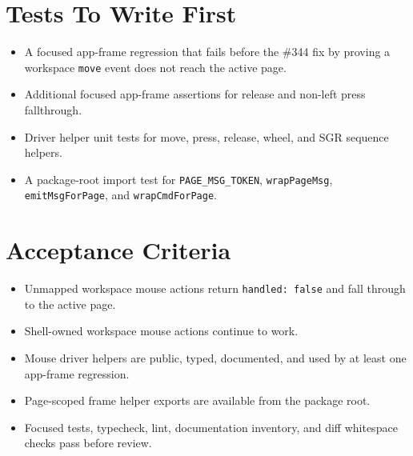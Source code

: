 \section{Tests To Write First}\label{record-165-tests-to-write-first}

\begin{itemize}
\tightlist
\item
  A focused app-frame regression that fails before the \#344 fix by proving a workspace \texttt{m\allowbreak{}o\allowbreak{}v\allowbreak{}e} event does not reach the active page.
\item
  Additional focused app-frame assertions for release and non-left press fallthrough.
\item
  Driver helper unit tests for move, press, release, wheel, and SGR sequence helpers.
\item
  A package-root import test for \texttt{P\allowbreak{}A\allowbreak{}G\allowbreak{}E\allowbreak{}\_\allowbreak{}M\allowbreak{}S\allowbreak{}G\allowbreak{}\_\allowbreak{}T\allowbreak{}O\allowbreak{}K\allowbreak{}E\allowbreak{}N}, \texttt{w\allowbreak{}r\allowbreak{}a\allowbreak{}p\allowbreak{}P\allowbreak{}a\allowbreak{}g\allowbreak{}e\allowbreak{}M\allowbreak{}s\allowbreak{}g}, \texttt{e\allowbreak{}m\allowbreak{}i\allowbreak{}t\allowbreak{}M\allowbreak{}s\allowbreak{}g\allowbreak{}F\allowbreak{}o\allowbreak{}r\allowbreak{}P\allowbreak{}a\allowbreak{}g\allowbreak{}e}, and \texttt{w\allowbreak{}r\allowbreak{}a\allowbreak{}p\allowbreak{}C\allowbreak{}m\allowbreak{}d\allowbreak{}F\allowbreak{}o\allowbreak{}r\allowbreak{}P\allowbreak{}a\allowbreak{}g\allowbreak{}e}.
\end{itemize}

\section{Acceptance Criteria}\label{record-165-acceptance-criteria}

\begin{itemize}
\tightlist
\item
  Unmapped workspace mouse actions return \texttt{h\allowbreak{}a\allowbreak{}n\allowbreak{}d\allowbreak{}l\allowbreak{}e\allowbreak{}d\allowbreak{}:\allowbreak{} \allowbreak{}f\allowbreak{}a\allowbreak{}l\allowbreak{}s\allowbreak{}e} and fall through to the active page.
\item
  Shell-owned workspace mouse actions continue to work.
\item
  Mouse driver helpers are public, typed, documented, and used by at least one app-frame regression.
\item
  Page-scoped frame helper exports are available from the package root.
\item
  Focused tests, typecheck, lint, documentation inventory, and diff whitespace checks pass before review.
\end{itemize}

